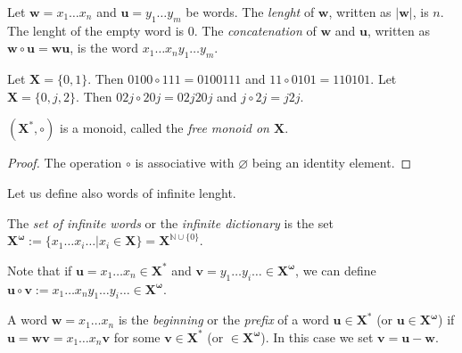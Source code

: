 \documentclass[mat1]{fmfdeloTS2.0}
\newcommand{\N}{\mathbb N}
\newcommand{\word}{\mathbf}				%
\newcommand{\abece}{\mathbf{X}}			%
\newcommand{\fslovar}{\mathbf{X^*}}		%
\newcommand{\infslovar}{\mathbf{X^\omega}}		%
\begin{document}
\begin{definition}
Let $\word{w}=x_1\dots x_n$ and $\word{u}=y_1\dots y_m$ be words. The \emph{lenght} of $\word{w}$, written as $|\word{w}|$, is $n$. The lenght of the empty word is $0$. The \emph{concatenation} of $\word{w}$ and $\word{u}$, written as $\word{w}\circ \word{u}=\word{w}\word{u}$, is the word $x_1\dots x_n y_1\dots y_m$.
\end{definition}


\begin{example}
Let $\abece=\{0,1\}$. Then $0100\circ 111=0100111$ and $11\circ 0101=110101$.
Let $\abece=\{0,j,2\}$. Then $02j\circ 20j=02j20j$ and $j\circ 2j=j2j$.
\end{example}

\begin{proposition}
$(\fslovar, \circ)$ is a monoid, called the \emph{free monoid on $\abece$}.
\begin{proof}
The operation $\circ$ is associative with $\varnothing$ being an identity element.
\end{proof}
\end{proposition}

Let us define also words of infinite lenght.

\begin{definition}
The \emph{set of infinite words} or the \emph{infinite dictionary} is the set $\infslovar:=\{x_1\dots x_i\dots|x_i\in \abece\}=\abece^{\N\cup\{0\}}$.
\end{definition}

\begin{remark}
Note that if $\word{u}=x_1\dots x_n\in\fslovar$ and $\word{v}=y_1\dots y_i\ldots \in\infslovar$, we can define $\word{u}\circ\word{v}:=x_1\dots x_n y_1\dots y_i\ldots \in\infslovar$.
\end{remark}

\begin{definition}
A word $\word{w}=x_1\dots x_n$ is the \emph{beginning} or the \emph{prefix} of a word $\word{u}\in\fslovar$ (or $\word{u}\in\infslovar$) if $\word{u}=\word{w}\word{v}=x_1\dots x_n \word{v}$ for some $\word{v}\in\fslovar$ (or $\in\infslovar$). In this case we set $\word{v}=\word{u}-\word{w}$.
\end{definition}
\end{document}
